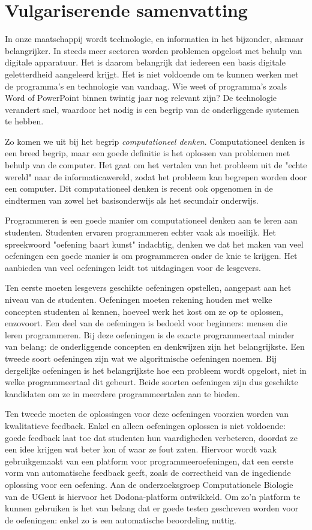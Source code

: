 \chapter*{Vulgariserende samenvatting}

In onze maatschappij wordt technologie, en informatica in het bijzonder, alsmaar belangrijker.
In steeds meer sectoren worden problemen opgelost met behulp van digitale apparatuur.
Het is daarom belangrijk dat iedereen een basis digitale geletterdheid aangeleerd krijgt.
Het is niet voldoende om te kunnen werken met de programma's en technologie van vandaag.
Wie weet of programma's zoals Word of PowerPoint binnen twintig jaar nog relevant zijn?
De technologie verandert snel, waardoor het nodig is een begrip van de onderliggende systemen te hebben.

Zo komen we uit bij het begrip \emph{computationeel denken}.
Computationeel denken is een breed begrip, maar een goede definitie is het oplossen van problemen met behulp van de computer.
Het gaat om het vertalen van het probleem uit de "echte wereld" naar de informaticawereld, zodat het probleem kan begrepen worden door een computer.
Dit computationeel denken is recent ook opgenomen in de eindtermen van zowel het basisonderwijs als het secundair onderwijs.

Programmeren is een goede manier om computationeel denken aan te leren aan studenten.
Studenten ervaren programmeren echter vaak als moeilijk.
Het spreekwoord "oefening baart kunst" indachtig, denken we dat het maken van veel oefeningen een goede manier is om programmeren onder de knie te krijgen.
Het aanbieden van veel oefeningen leidt tot uitdagingen voor de lesgevers.

Ten eerste moeten lesgevers geschikte oefeningen opstellen, aangepast aan het niveau van de studenten.
Oefeningen moeten rekening houden met welke concepten studenten al kennen, hoeveel werk het kost om ze op te oplossen, enzovoort.
Een deel van de oefeningen is bedoeld voor beginners: mensen die leren programmeren.
Bij deze oefeningen is de exacte programmeertaal minder van belang: de onderliggende concepten en denkwijzen zijn het belangrijkste.
Een tweede soort oefeningen zijn wat we algoritmische oefeningen noemen.
Bij dergelijke oefeningen is het belangrijkste hoe een probleem wordt opgelost, niet in welke programmeertaal dit gebeurt.
Beide soorten oefeningen zijn dus geschikte kandidaten om ze in meerdere programmeertalen aan te bieden.

Ten tweede moeten de oplossingen voor deze oefeningen voorzien worden van kwalitatieve feedback.
Enkel en alleen oefeningen oplossen is niet voldoende: goede feedback laat toe dat studenten hun vaardigheden verbeteren, doordat ze een idee krijgen wat beter kon of waar ze fout zaten.
Hiervoor wordt vaak gebruikgemaakt van een platform voor programmeeroefeningen, dat een eerste vorm van automatische feedback geeft, zoals de correctheid van de ingediende oplossing voor een oefening.
Aan de onderzoeksgroep Computationele Biologie van de UGent is hiervoor het Dodona-platform ontwikkeld.
Om zo'n platform te kunnen gebruiken is het van belang dat er goede testen geschreven worden voor de oefeningen: enkel zo is een automatische beoordeling nuttig.

